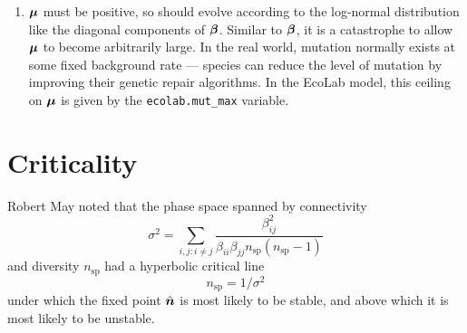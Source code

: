 \documentclass{article}
\newcommand{\bbeta}{\mbox{\boldmath{$\beta$}}}   %
\newcommand{\bmu}{\mbox{\boldmath{$\mu$}}}       %
\newcommand{\bn}{\mbox{\boldmath{$n$}}}          %
\providecommand{\naturals}{\mathbb{N}}
\begin{document}
\begin{enumerate}
To convert  condition (\ref{boundedness2}) into something tractable for the mutation
operator, we make use of the fact that $n\in\naturals^n$.

Let 
\begin{displaymath}
b=\sum_{i: B_i+C_i>0}B_i+C_i.
\end{displaymath}
Then a sufficient but
not necessary condition for condition (\ref{boundedness2}) is
\begin{displaymath}
b+Dn_2\leq0
\end{displaymath}

Since $D<0$, the maximum of $b+Dn_2$ for
$n_2\in\naturals$ occurs for $n_2=1$, so the condition becomes:
\begin{equation}\label{final-condition}
  D<-b.
\end{equation}

Originally, this condition was achieved by adjusting the values of the
offdiagonal components added to the interaction matrix \bbeta, but
this had the unfortunate effect of gradually reducing the connectivity
over simulation time, leading to a natural growth in diversity (see
\S\ref{nsp-connectivity}). So now, we adjust the newly added diagonal
term $D$ to be strictly less than $\max\{-b, 0\}$, retaining a natural
conservation of connectivity under mutation dynamics.

\item $\bmu$ must be positive, so should evolve according to the
  log-normal distribution like the diagonal components of $\bbeta$.
  Similar to $\bbeta$, it is a catastrophe to allow $\bmu$ to become
  arbitrarily large. In the real world, mutation normally exists at
  some fixed background rate --- species can reduce the level of
  mutation by improving their genetic repair algorithms. In the EcoLab
  model, this ceiling on $\bmu$ is given by the
  \verb|ecolab.mut_max| variable.

\end{enumerate}

\section{Criticality}

Robert May\cite{May72} noted that the phase space spanned by
connectivity
\begin{equation}
\sigma^2=\sum_{i,j: i\ne j}
\frac{\beta_{ij}^2}{\beta_{ii}\beta_{jj}n_\mathrm{sp}(n_\mathrm{sp}-1)}
\end{equation}
and diversity
$n_\mathrm{sp}$ had a hyperbolic critical line
\begin{equation}
  n_\mathrm{sp}=1/\sigma^2
\end{equation}
under which the fixed point $\hat{\bn}$ is
most likely to be stable, and above which it is most likely to be
unstable.
\end{document}
